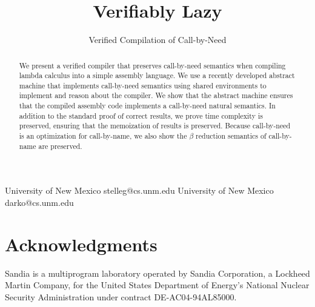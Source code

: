 \documentclass[preprint]{sigplanconf}
\begin{document}
\copyrightdata{[to be supplied]} 


\title{Verifiably Lazy}
\subtitle{Verified Compilation of Call-by-Need}

           {University of New Mexico}
           {stelleg@cs.unm.edu}
           {University of New Mexico}
           {darko@cs.unm.edu}
\maketitle

\begin{abstract}
We present a verified compiler that preserves call-by-need semantics when
compiling lambda calculus into a simple assembly language. We use a recently
developed abstract machine that implements call-by-need semantics using shared
environments to implement and reason about the compiler. We show that the
abstract machine ensures that the compiled assembly code implements a
call-by-need natural semantics. In addition to the standard proof of correct
results, we prove time complexity is preserved, ensuring that the memoization
of results is preserved. Because call-by-need is an optimization for
call-by-name, we also show the $\beta$ reduction semantics of call-by-name are
preserved.
\end{abstract}










\section{Acknowledgments}
Sandia is a multiprogram laboratory operated by Sandia Corporation, a Lockheed Martin Company, for the United States Department of Energy’s National Nuclear Security Administration under contract DE-AC04-94AL85000.



\end{document}
